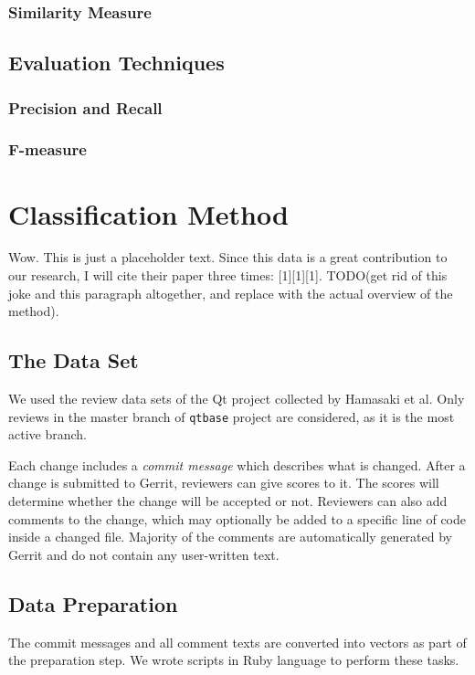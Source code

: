 \documentclass[conference]{IEEEtran}
\begin{document}
\subsubsection{Similarity Measure}
\subsection{Evaluation Techniques}
\subsubsection{Precision and Recall}
\subsubsection{F-measure}


\section{Classification Method}

Wow. This is just a placeholder text. Since this data is a great contribution to our research, I will cite their paper three times: [1][1][1].
TODO(get rid of this joke and this paragraph altogether, and replace with the actual overview of the method).

\subsection{The Data Set}

We used the review data sets of the Qt project collected by Hamasaki et al.
Only reviews in the master branch of \texttt{qtbase} project are considered,
as it is the most active branch.

Each change includes a \emph{commit message} which describes what is changed.
After a change is submitted to Gerrit, reviewers can give scores to it.
The scores will determine whether the change will be accepted or not.
Reviewers can also add comments to the change, which may optionally be added to a specific line of code inside a changed file.
Majority of the comments are automatically generated by Gerrit and do not contain any user-written text.

\subsection{Data Preparation}

The commit messages and all comment texts are converted into vectors as part of the preparation step.
We wrote scripts in Ruby language to perform these tasks.
\end{document}
